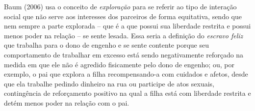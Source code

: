 Baum (2006) usa o conceito de \textit{exploração} para se referir ao tipo de interação social que não serve aos interesses dos parceiros de forma equitativa, sendo que nem sempre a parte explorada – que é a que possui sua liberdade restrita e possui menos poder na relação – se sente lesada. Essa seria a definição do \textit{escravo feliz} que trabalha para o dono de engenho e se sente contente porque seu comportamento de trabalhar em excesso está sendo negativamente reforçado na medida em que ele não é agredido fisicamente pelo dono de engenho; ou, por exemplo, o pai que explora a filha recompensando-a com cuidados e afetos, desde que ela trabalhe pedindo dinheiro na rua ou participe de atos sexuais, contingência de reforçamento positivo na qual a filha está com liberdade restrita e detém menos poder na relação com o pai. 

